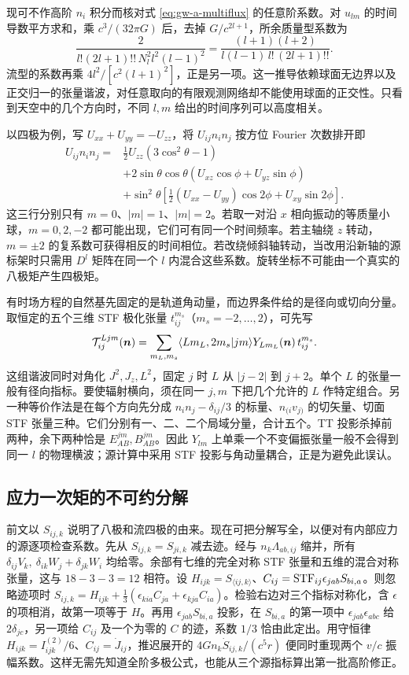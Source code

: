 现可不作高阶 $n_i$ 积分而核对式 \eqref{eq:gw-a-multiflux} 的任意阶系数。对 $u_{lm}$ 的时间导数平方求和，乘 $c^3/(32\pi G)$ 后，去掉 $G/c^{2l+1}$，所余质量型系数为
\[
 \frac{2}{l!(2l+1)!!\,N_l^2 l^2(l-1)^2}
   =\frac{(l+1)(l+2)}{l(l-1)\,l!\,(2l+1)!!}.
\]
流型的系数再乘 $4l^2/[c^2(l+1)^2]$，正是另一项。这一推导依赖球面无边界以及正交归一的张量谐波，对任意取向的有限观测网络却不能使用球面的正交性。只看到天空中的几个方向时，不同 $l,m$ 给出的时间序列可以高度相关。

以四极为例，写 $U_{xx}+U_{yy}=-U_{zz}$，将 $U_{ij}n_in_j$ 按方位 Fourier 次数排开即
\begin{align*}
 U_{ij}n_i n_j={}&\tfrac12 U_{zz}(3\cos^2\theta-1)\\
 &+2\sin\theta\cos\theta(U_{xz}\cos\phi+U_{yz}\sin\phi)\\
 &+\sin^2\theta[\tfrac12(U_{xx}-U_{yy})\cos2\phi+U_{xy}\sin2\phi].
\end{align*}
这三行分别只有 $m=0$、$|m|=1$、$|m|=2$。若取一对沿 $x$ 相向振动的等质量小球，$m=0,2,-2$ 都可能出现，它们可有同一个时间频率。若主轴绕 $z$ 转动，$m=\pm2$ 的复系数可获得相反的时间相位。若改绕倾斜轴转动，当改用沿新轴的源标架时只需用 $D^l$ 矩阵在同一个 $l$ 内混合这些系数。旋转坐标不可能由一个真实的八极矩产生四极矩。

有时场方程的自然基先固定的是轨道角动量，而边界条件给的是径向或切向分量。取恒定的五个三维 STF 极化张量 $t^{m_s}_{ij}$（$m_s=-2,\ldots,2$），可先写
\[
 {\cal T}^{Lj m}_{ij}(\bm n)
 =\sum_{m_L,m_s}\langle Lm_L,2m_s|jm\rangle
                   Y_{Lm_L}(\bm n)\,t^{m_s}_{ij}.
\]
这组谐波同时对角化 $J^2,J_z,L^2$，固定 $j$ 时 $L$ 从 $|j-2|$ 到 $j+2$。单个 $L$ 的张量一般有径向指标。要使辐射横向，须在同一 $j,m$ 下把几个允许的 $L$ 作特定组合。另一种等价作法是在每个方向先分成 $n_i n_j-\delta_{ij}/3$ 的标量、$n_{(i}v_{j)}$ 的切矢量、切面 STF 张量三种。它们分别有一、二、二个局域分量，合计五个。TT 投影杀掉前两种，余下两种恰是 $E^{jm}_{AB},B^{jm}_{AB}$。因此 $Y_{lm}$ 上单乘一个不变偏振张量一般不会得到同一 $l$ 的物理横波；源计算中采用 STF 投影与角动量耦合，正是为避免此误认。

\subsection{应力一次矩的不可约分解}

前文以 $S_{ij,k}$ 说明了八极和流四极的由来。现在可把分解写全，以便对有内部应力的源逐项检查系数。先从 $S_{ij,k}=S_{ji,k}$ 减去迹。经与 $n_k\Lambda_{ab,ij}$ 缩并，所有 $\delta_{ij}V_k,\ \delta_{ik}W_j+\delta_{jk}W_i$ 均给零。余部有七维的完全对称 STF 张量和五维的混合对称张量，这与 $18-3-3=12$ 相符。设 $H_{ijk}=S_{\langle ij,k\rangle}$、$C_{ij}={\rm STF}_{ij}\epsilon_{jab}S_{bi,a}$。则忽略迹项时 $S_{ij,k}=H_{ijk}+\tfrac13(\epsilon_{ki a}C_{ja}+\epsilon_{kj a}C_{ia})$。检验右边对三个指标对称化，含 $\epsilon$ 的项相消，故第一项等于 $H$。再用 $\epsilon_{jab}S_{bi,a}$ 投影，在 $S_{bi,a}$ 的第一项中 $\epsilon_{jab}\epsilon_{ab c}$ 给 $2\delta_{jc}$，另一项给 $C_{ij}$ 及一个为零的 $C$ 的迹，系数 $1/3$ 恰由此定出。用守恒律 $H_{ijk}=I^{(2)}_{ijk}/6$、$C_{ij}=\dot J_{ij}$，推迟展开的 $4G n_k\dot S_{ij,k}/(c^5r)$ 便同时重现两个 $v/c$ 振幅系数。这样无需先知道全阶多极公式，也能从三个源指标算出第一批高阶修正。

